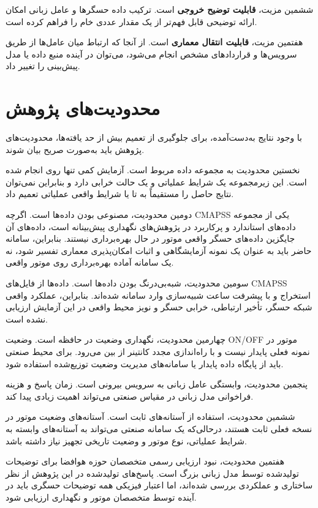 ششمین مزیت، \textbf{قابلیت توضیح خروجی} است. ترکیب داده حسگرها و عامل زبانی امکان ارائه توضیحی قابل فهم‌تر از یک مقدار عددی خام را فراهم کرده است.

هفتمین مزیت، \textbf{قابلیت انتقال معماری} است. از آنجا که ارتباط میان عامل‌ها از طریق سرویس‌ها و قراردادهای مشخص انجام می‌شود، می‌توان در آینده منبع داده یا مدل پیش‌بینی را تغییر داد.




\section{محدودیت‌های پژوهش}
\label{sec:limitations-final}

با وجود نتایج به‌دست‌آمده، برای جلوگیری از تعمیم بیش از حد یافته‌ها، محدودیت‌های پژوهش باید به‌صورت صریح بیان شوند.

نخستین محدودیت به مجموعه داده مربوط است. آزمایش کمی تنها روی  انجام شده است. این زیرمجموعه یک شرایط عملیاتی و یک حالت خرابی دارد و بنابراین نمی‌توان نتایج حاصل را مستقیماً به  تا  یا شرایط واقعی عملیاتی تعمیم داد.

دومین محدودیت، مصنوعی بودن داده‌ها است. اگرچه \gls{CMAPSS} یکی از مجموعه داده‌های استاندارد و پرکاربرد در پژوهش‌های نگهداری پیش‌بینانه است، داده‌های آن جایگزین داده‌های حسگر واقعی موتور در حال بهره‌برداری نیستند. بنابراین، سامانه حاضر باید به عنوان یک نمونه آزمایشگاهی و اثبات امکان‌پذیری معماری تفسیر شود، نه یک سامانه آماده بهره‌برداری روی موتور واقعی.

سومین محدودیت، شبه‌بی‌درنگ بودن داده‌ها است. داده‌ها از فایل‌های CMAPSS استخراج و با پیشرفت ساعت شبیه‌سازی وارد سامانه شده‌اند. بنابراین، عملکرد واقعی شبکه حسگر، تأخیر ارتباطی، خرابی حسگر و نویز محیط واقعی در این آزمایش ارزیابی نشده است.

چهارمین محدودیت، نگهداری وضعیت در حافظه است. وضعیت ON/OFF موتور در نمونه فعلی پایدار نیست و با راه‌اندازی مجدد کانتینر از بین می‌رود. برای محیط صنعتی باید از پایگاه داده پایدار یا سامانه‌های مدیریت وضعیت توزیع‌شده استفاده شود.

پنجمین محدودیت، وابستگی عامل زبانی به سرویس بیرونی است. زمان پاسخ و هزینه فراخوانی مدل زبانی در مقیاس صنعتی می‌تواند اهمیت زیادی پیدا کند.

ششمین محدودیت، استفاده از آستانه‌های ثابت است. آستانه‌های وضعیت موتور در نسخه فعلی ثابت هستند، درحالی‌که یک سامانه صنعتی می‌تواند به آستانه‌های وابسته به شرایط عملیاتی، نوع موتور و وضعیت تاریخی تجهیز نیاز داشته باشد.

هفتمین محدودیت، نبود ارزیابی رسمی متخصصان حوزه هوافضا برای توضیحات تولیدشده توسط مدل زبانی بزرگ است. پاسخ‌های تولیدشده در این پژوهش از نظر ساختاری و عملکردی بررسی شده‌اند، اما اعتبار فیزیکی همه توضیحات حسگری باید در آینده توسط متخصصان موتور و نگهداری ارزیابی شود.



